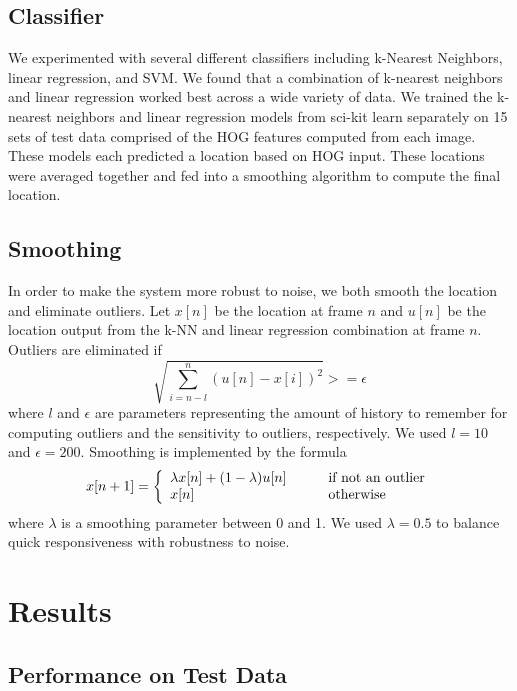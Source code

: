 \documentclass[10pt,twocolumn,letterpaper]{article}
\begin{document}
\subsection{Classifier}
We experimented with several different classifiers including k-Nearest Neighbors, linear regression, and SVM. We found that a combination of k-nearest neighbors and linear regression worked best across a wide variety of data. We trained the k-nearest neighbors and linear regression models from sci-kit learn separately on 15 sets of test data comprised of the HOG features computed from each image. These models each predicted a location based on HOG input. These locations were averaged together and fed into a smoothing algorithm to compute the final location.

\subsection{Smoothing}
In order to make the system more robust to noise, we both smooth the location and eliminate outliers. Let $x[n]$ be the location at frame $n$ and $u[n]$ be the location output from the k-NN and linear regression combination at frame $n$. Outliers are eliminated if
\begin{equation}
	\sqrt{\sum_{i=n-l}^{n}(u[n]-x[i])^2} >= \epsilon
\end{equation}
where $l$ and $\epsilon$ are parameters representing the amount of history to remember for computing outliers and the sensitivity to outliers, respectively. We used $l=10$ and $\epsilon=200$. Smoothing is implemented by the formula 
\begin{equation}
	x[n+1] = \left\{
		\begin{array}{l l}
			\lambda x[n] + (1-\lambda)u[n] & \qquad \text{if not an outlier} \\
			x[n] & \qquad \text{otherwise}
		\end{array}
	\right.
\end{equation}
 where $\lambda$ is a smoothing parameter between 0 and 1. We used $\lambda=0.5$ to balance quick responsiveness with robustness to noise.

\section{Results}

\subsection{Performance on Test Data}
\end{document}
